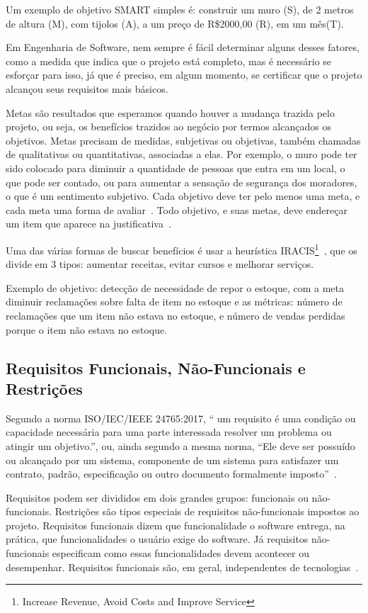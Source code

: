 \documentclass[fontsize=12pt, a4paper,pagesize=auto,toc=listof, ,twoside,chapterprefix=false,appendixprefix=true,open=right]{scrbook}
\begin{document}
Um exemplo de objetivo SMART simples é:  construir um muro (S), de 2 metros de altura (M), com tijolos (A), a um preço de R\$2000,00 (R), em um mês(T).

Em Engenharia de Software, nem sempre é fácil determinar alguns desses fatores, como a medida que indica que o projeto está completo, mas é necessário se esforçar para isso, já que é preciso, em algum momento, se certificar que o projeto alcançou seus requisitos mais básicos.


Metas são resultados que esperamos quando houver a mudança trazida pelo projeto, ou seja, os benefícios trazidos ao negócio por termos alcançados os objetivos.
Metas precisam de medidas, subjetivas ou objetivas, também chamadas de qualitativas ou quantitativas, associadas a elas.
Por exemplo, o muro pode ter sido colocado para diminuir a quantidade de pessoas que entra em um local, o que pode ser contado, ou para aumentar a sensação de segurança dos moradores, o que é um sentimento subjetivo.
Cada objetivo deve ter pelo menos uma meta, e cada meta uma forma de avaliar~\citep{ruble_practical_1997}.
Todo objetivo, e suas metas, deve endereçar um item que aparece na justificativa~\citep{finocchio:2013}.

Uma das várias formas de buscar benefícios é usar a heurística IRACIS\footnote{Increase Revenue, Avoid Costs and Improve Service}~\citep{gane:sarson:ssa,ruble_practical_1997}, que os divide em 3 tipos: aumentar receitas, evitar cursos e melhorar serviços.

Exemplo de objetivo: detecção de necessidade de repor o estoque, com a meta diminuir reclamações sobre falta de item no estoque e as métricas: número de reclamações que um item não estava no estoque, e número de vendas perdidas porque o item não estava no estoque.

\subsection{Requisitos Funcionais, Não-Funcionais e Restrições}

Segundo a norma ISO/IEC/IEEE 24765:2017, `` um requisito é uma condição ou capacidade necessária para uma parte interessada resolver um problema ou atingir um objetivo.'', ou, ainda segundo a mesma norma, ``Ele deve ser possuído ou alcançado por um sistema, componente de um sistema para satisfazer um contrato, padrão, especificação ou outro documento formalmente imposto''~\citep{IEEE:24765:2017}.

Requisitos podem ser divididos em dois grandes grupos: funcionais ou não-funcionais.
Restrições são tipos especiais de requisitos não-funcionais impostos ao projeto.
Requisitos funcionais dizem que funcionalidade o software entrega, na prática, que funcionalidades o usuário exige do software.
Já requisitos não-funcionais especificam como essas funcionalidades devem acontecer ou desempenhar.
Requisitos funcionais são, em geral, independentes de tecnologias~\cite{essential:palmer}.
\end{document}
